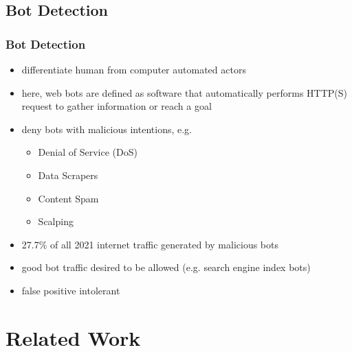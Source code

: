 \documentclass[t,aspectratio=169,table]{beamer}
\begin{document}
\subsection{Bot Detection}
\begin{frame}
\frametitle{Bot Detection}

\begin{itemize}
    \item differentiate human from computer automated actors
    \item here, web bots are defined as software that automatically performs HTTP(S) request to gather information or reach a goal
    \item deny bots with malicious intentions, e.g.
    \begin{itemize}
        \item Denial of Service (DoS)
        \item Data Scrapers
        \item Content Spam
        \item Scalping
    \end{itemize}
    \item 27.7\% of all 2021 internet traffic generated by malicious bots \cite{BAD_BOT_REPORT2022}
    \item good bot traffic desired to be allowed (e.g. search engine index bots)
    \item false positive intolerant
\end{itemize}

\end{frame}

\section{Related Work}
\end{document}

